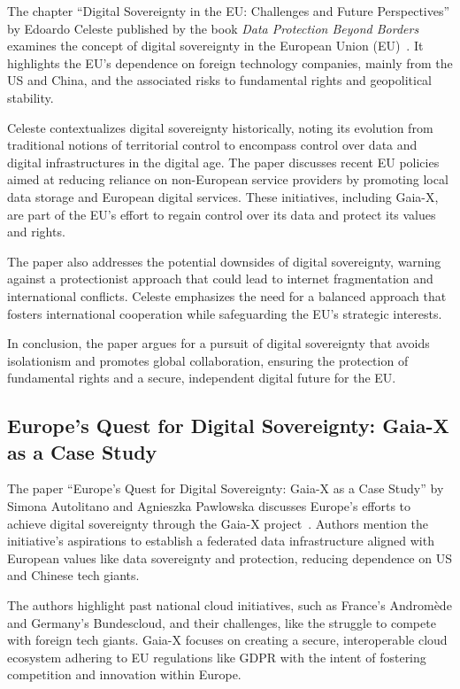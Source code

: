 The chapter ``Digital Sovereignty in the EU: Challenges and Future Perspectives'' by Edoardo Celeste published by the book \textit{Data Protection Beyond Borders} examines the concept of digital sovereignty in the European Union (EU)~\cite{dig_sovereignty_challenges}.
It highlights the EU's dependence on foreign technology companies, mainly from the US and China, and the associated risks to fundamental rights and geopolitical stability.

Celeste contextualizes digital sovereignty historically, noting its evolution from traditional notions of territorial control to encompass control over data and digital infrastructures in the digital age.
The paper discusses recent EU policies aimed at reducing reliance on non-European service providers by promoting local data storage and European digital services.
These initiatives, including Gaia-X, are part of the EU's effort to regain control over its data and protect its values and rights.

The paper also addresses the potential downsides of digital sovereignty, warning against a protectionist approach that could lead to internet fragmentation and international conflicts.
Celeste emphasizes the need for a balanced approach that fosters international cooperation while safeguarding the EU's strategic interests.

In conclusion, the paper argues for a pursuit of digital sovereignty that avoids isolationism and promotes global collaboration, ensuring the protection of fundamental rights and a secure, independent digital future for the EU.

\subsection{Europe's Quest for Digital Sovereignty: Gaia-X as a Case Study}\label{subsec:europe's-quest-for-digital-sovereignty:-gaia-x-as-a-case-study}

The paper ``Europe’s Quest for Digital Sovereignty: Gaia-X as a Case Study'' by Simona Autolitano and Agnieszka Pawlowska discusses Europe's efforts to achieve digital sovereignty through the Gaia-X project~\cite{europe_quest_for_digital_sovereignty}.
Authors mention the initiative's aspirations to establish a federated data infrastructure aligned with European values like data sovereignty and protection, reducing dependence on US and Chinese tech giants.

The authors highlight past national cloud initiatives, such as France’s Andromède and Germany’s Bundescloud, and their challenges, like the struggle to compete with foreign tech giants.
Gaia-X focuses on creating a secure, interoperable cloud ecosystem adhering to EU regulations like GDPR with the intent of fostering competition and innovation within Europe.

